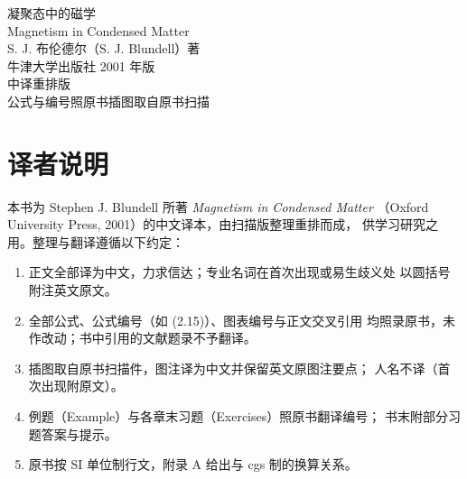 \documentclass[11pt,a4paper,twoside,openright]{ctexbook}
\renewcommand{\chaptermark}[1]{\markboth{第\arabic{chapter}章\quad #1}{}}
\begin{document}
\begin{titlepage}
\thispagestyle{empty}
\centering
\vspace*{3.2cm}
{\heiti 凝聚态中的磁学}\\[1.2em]
{\kaishu Magnetism in Condensed Matter}\\[3.5em]
{S. J. 布伦德尔（S. J. Blundell）\quad 著}\\[1.0em]
{\kaishu 牛津大学出版社 2001 年版}\\[2.5em]
{\kaishu 中译重排版}\\[1em]
{\kaishu 公式与编号照原书\quad 插图取自原书扫描}
\vfill
\end{titlepage}

\thispagestyle{empty}\mbox{}\clearpage

\frontmatter
\chapter*{译者说明}
本书为 Stephen J. Blundell 所著 \emph{Magnetism in Condensed Matter}
（Oxford University Press, 2001）的中文译本，由扫描版整理重排而成，
供学习研究之用。整理与翻译遵循以下约定：
\begin{enumerate}[itemsep=0.2em]
  \item 正文全部译为中文，力求信达；专业名词在首次出现或易生歧义处
        以圆括号附注英文原文。
  \item 全部公式、公式编号（如 (2.15)）、图表编号与正文交叉引用
        均照录原书，未作改动；书中引用的文献题录不予翻译。
  \item 插图取自原书扫描件，图注译为中文并保留英文原图注要点；
        人名不译（首次出现附原文）。
  \item 例题（Example）与各章末习题（Exercises）照原书翻译编号；
        书末附部分习题答案与提示。
  \item 原书按 SI 单位制行文，附录 A 给出与 cgs 制的换算关系。
\end{enumerate}



\tableofcontents

\mainmatter










\appendix
{}
\renewcommand{\chaptermark}[1]{\markboth{附录\Alph{chapter}\quad #1}{}}
%
%
%
%
%
%
%
\end{document}
